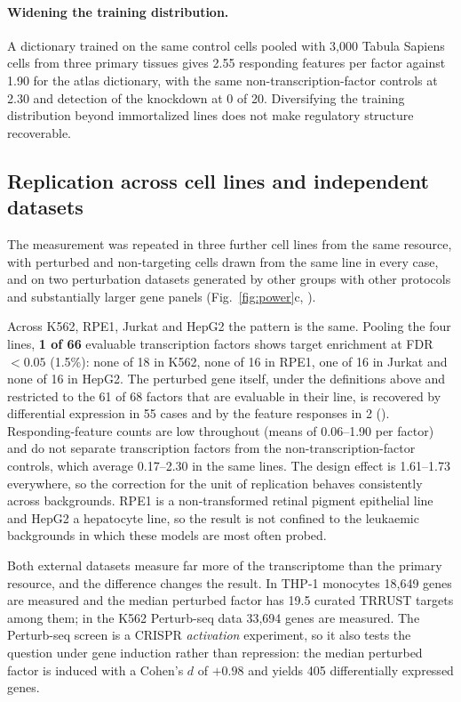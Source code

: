 \paragraph{Widening the training distribution.} A dictionary trained on the same control cells
pooled with 3,000 Tabula Sapiens cells from three primary tissues gives 2.55 responding features per
factor against 1.90 for the atlas dictionary, with the same non-transcription-factor controls at
2.30 and detection of the knockdown at 0 of 20. Diversifying the training distribution beyond
immortalized lines does not make regulatory structure recoverable.

\subsection*{Replication across cell lines and independent datasets}
\label{sec:replication}

The measurement was repeated in three further cell lines from the same resource, with perturbed and
non-targeting cells drawn from the same line in every case, and on two perturbation datasets
generated by other groups with other protocols and substantially larger gene panels
(Fig.~\ref{fig:power}c, ).

Across K562, RPE1, Jurkat and HepG2 the pattern is the same. Pooling the four lines,
\textbf{1 of 66} evaluable transcription factors shows target enrichment at FDR $< 0.05$
(1.5\%): none of 18 in K562, none of 16 in RPE1, one of 16 in Jurkat and none of 16 in HepG2. The
perturbed gene itself, under the definitions above and restricted to the 61 of 68 factors that are
evaluable in their line, is recovered by differential expression in 55 cases and by the feature
responses in 2 (). Responding-feature
counts are low throughout (means of 0.06--1.90 per factor) and do not separate transcription
factors from the non-transcription-factor controls, which average 0.17--2.30 in the same lines. The
design effect is 1.61--1.73 everywhere, so the correction for the unit of replication behaves
consistently across backgrounds. RPE1 is a non-transformed retinal pigment epithelial line and
HepG2 a hepatocyte line, so the result is not confined to the leukaemic backgrounds in which these
models are most often probed.

Both external datasets measure far more of the transcriptome than the primary resource, and the
difference changes the result. In THP-1 monocytes 18,649 genes are measured and the median
perturbed factor has 19.5 curated TRRUST targets among them; in the K562 Perturb-seq data 33,694
genes are measured. The Perturb-seq screen is a CRISPR \emph{activation} experiment, so it also
tests the question under gene induction rather than repression: the median perturbed factor is
induced with a Cohen's $d$ of $+0.98$ and yields 405 differentially expressed genes.

